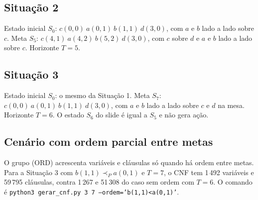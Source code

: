 \subsection{Situação 2}
Estado inicial $S_0$: $c(0,0)\ a(0,1)\ b(1,1)\ d(3,0)$, com $a$ e $b$ lado a lado sobre $c$. Meta $S_5$: $c(4,1)\ a(4,2)\ b(5,2)\ d(3,0)$, com $c$ sobre $d$ e $a$ e $b$ lado a lado sobre $c$. Horizonte $T=5$.

\subsection{Situação 3}
Estado inicial $S_0$: o mesmo da Situação 1. Meta $S_7$: $c(0,0)\ a(0,1)\ b(1,1)\ d(3,0)$, com $a$ e $b$ lado a lado sobre $c$ e $d$ na mesa. Horizonte $T=6$. O estado $S_6$ do slide é igual a $S_5$ e não gera ação.

\subsection{Cenário com ordem parcial entre metas}
O grupo (ORD) acrescenta variáveis e cláusulas só quando há ordem entre metas. Para a Situação 3 com $b(1,1)\prec_P a(0,1)$ e $T=7$, o CNF tem 1\,492 variáveis e 59\,795 cláusulas, contra 1\,267 e 51\,308 do caso sem ordem com $T=6$. O comando é \texttt{python3 gerar\_cnf.py 3 7 --ordem='b(1,1)<a(0,1)'}.
